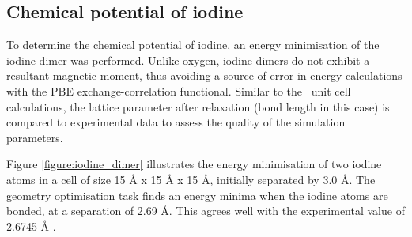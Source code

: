 \begin{table}[ht] %
\onehalfspacing
\centering
\caption[Calculated unit cell parameters for the different crystal structures of \zirconia . Experimental data for pure monoclinic, yttria-stabilised tetragonal and magnesia-stabilised cubic phases at 295 K are shown in parentheses. Energy difference between structures is shown with respect to the cubic phase.]{Calculated unit cell parameters for the different crystal structures of \zirconia . Experimental data for monoclinic, tetragonal and cubic phases at 295 K are shown in parentheses \cite{Howard1988}. Energy difference between structures is shown with respect to the cubic phase.}
\label{lattice_params}
\end{table}


\subsection{Chemical potential of iodine}

To determine the chemical potential of iodine, an energy minimisation of the iodine dimer was performed. Unlike oxygen, iodine dimers do not exhibit a resultant magnetic moment, thus avoiding a source of error in energy calculations with the PBE exchange-correlation functional. Similar to the \zirconia\ unit cell calculations, the lattice parameter after relaxation (bond length in this case) is compared to experimental data to assess the quality of the simulation parameters.

Figure \ref{figure:iodine_dimer} illustrates the energy minimisation of two iodine atoms in a cell of size 15 \r{A} x 15 \r{A} x 15 \r{A}, initially separated by 3.0 \r{A}. The geometry optimisation task finds an energy minima when the iodine atoms are bonded, at a separation of 2.69 \r{A}. This agrees well with the experimental value of 2.6745 \r{A} \cite{ukaji1966effect}.

